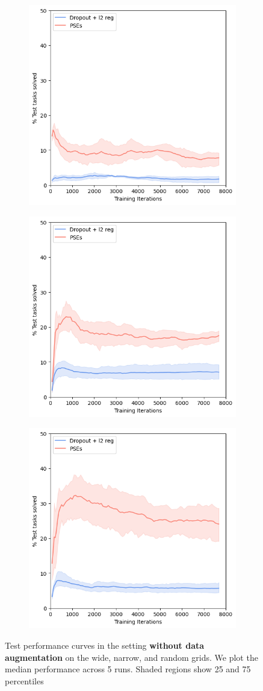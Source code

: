 \documentclass{usiinftr}
\begin{document}
\begin{figure}[h]
    \centering
    \begin{subfigure}
        \centering
        \includegraphics[width = 0.3\linewidth]{figures/narrow_without_data_aug.png}
        \label{}
    \end{subfigure}%
    \begin{subfigure}
        \centering
        \includegraphics[width = 0.3\linewidth]{figures/wide_without_data_aug.png}
        \label{}
    \end{subfigure}%
    \begin{subfigure}
        \centering
        \includegraphics[width = 0.3\linewidth]{figures/random_without_data_aug.png}
        \label{}
    \end{subfigure}%
    \caption{Test performance curves in the setting \textbf{without data augmentation} on the wide, narrow, and random grids. We plot the median performance across 5 runs. Shaded regions show 25 and 75 percentiles}
    \label{fig:ResultWithoutDataAug}
\end{figure}
\end{document}
